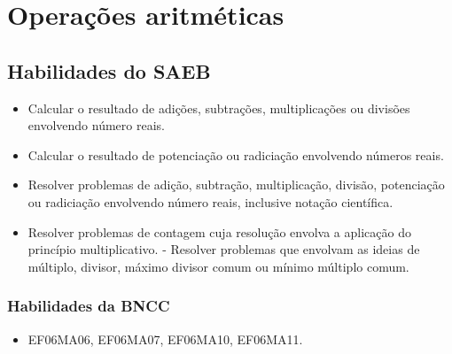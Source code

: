 
\chapter{Operações aritméticas}

\vspace*{-1cm}
\enlargethispage{3\baselineskip}

\section*{Habilidades do SAEB}

\begin{itemize}
\item Calcular o resultado de adições, subtrações,
multiplicações ou divisões envolvendo número reais. 
\item Calcular o
resultado de potenciação ou radiciação envolvendo números reais.
\item Resolver problemas de adição, subtração, multiplicação, divisão,
  potenciação ou radiciação envolvendo número reais, inclusive notação
  científica.
\item Resolver problemas de contagem cuja resolução envolva a aplicação do
  princípio multiplicativo. - Resolver problemas que envolvam as ideias
  de múltiplo, divisor, máximo divisor comum ou mínimo múltiplo comum.
\end{itemize}

\subsection{Habilidades da BNCC}
\begin{itemize} 
\item  EF06MA06, EF06MA07, EF06MA10, EF06MA11.
\end{itemize}



